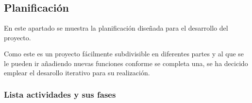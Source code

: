 \chapter{}

\section{Planificación}

En este apartado se muestra la planificación diseñada para el desarrollo del proyecto.
 
 Como este es un proyecto fácilmente subdivisible en diferentes partes y al que  se le pueden ir añadiendo nuevas funciones conforme se completa una, se ha decicido emplear el desarollo iterativo para su realización.


\subsection{Lista actividades y sus fases}

